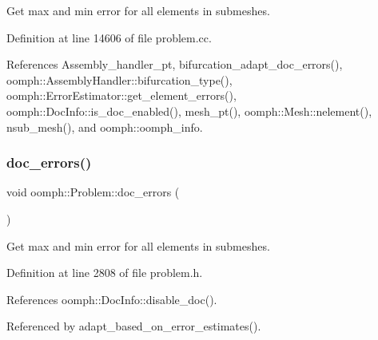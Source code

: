 Get max and min error for all elements in submeshes. 



Definition at line 14606 of file problem.\+cc.



References Assembly\+\_\+handler\+\_\+pt, bifurcation\+\_\+adapt\+\_\+doc\+\_\+errors(), oomph\+::\+Assembly\+Handler\+::bifurcation\+\_\+type(), oomph\+::\+Error\+Estimator\+::get\+\_\+element\+\_\+errors(), oomph\+::\+Doc\+Info\+::is\+\_\+doc\+\_\+enabled(), mesh\+\_\+pt(), oomph\+::\+Mesh\+::nelement(), nsub\+\_\+mesh(), and oomph\+::oomph\+\_\+info.

\mbox{\label{classoomph_1_1Problem_af2a9dfdb7b4f95bb941d48411f955f55}} 
\subsubsection{\texorpdfstring{doc\+\_\+errors()}{doc\_errors()}\hspace{0.1cm}{\footnotesize\ttfamily [2/2]}}
{\footnotesize\ttfamily void oomph\+::\+Problem\+::doc\+\_\+errors (\begin{DoxyParamCaption}{ }\end{DoxyParamCaption})\hspace{0.3cm}{\ttfamily [inline]}}



Get max and min error for all elements in submeshes. 



Definition at line 2808 of file problem.\+h.



References oomph\+::\+Doc\+Info\+::disable\+\_\+doc().



Referenced by adapt\+\_\+based\+\_\+on\+\_\+error\+\_\+estimates().

\mbox{\label{classoomph_1_1Problem_af7a83b109e7662abd52ea552d89163cc}} 
